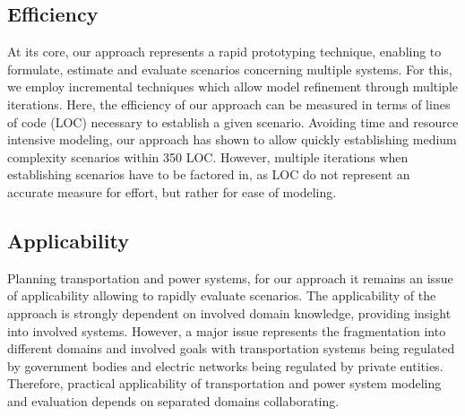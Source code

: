 \subsection{Efficiency}

At its core, our approach represents a rapid prototyping technique, enabling to formulate, estimate and evaluate scenarios concerning multiple systems. For this, we employ incremental techniques which allow model refinement through multiple iterations. Here, the efficiency of our approach can be measured in terms of lines of code (LOC) necessary to establish a given scenario. Avoiding time and resource intensive modeling, our approach has shown to allow quickly establishing medium complexity scenarios within 350 LOC. However, multiple iterations when establishing scenarios have to be factored in, as LOC do not represent an accurate measure for effort, but rather for ease of modeling.

\subsection{Applicability}

Planning transportation and power systems, for our approach it remains an issue of applicability allowing to rapidly evaluate scenarios. The applicability of the approach is strongly dependent on involved domain knowledge, providing insight into involved systems. However, a major issue represents the fragmentation into different domains and involved goals with transportation systems being regulated by government bodies and electric networks being regulated by private entities. Therefore, practical applicability of transportation and power system modeling and evaluation depends on separated domains collaborating.